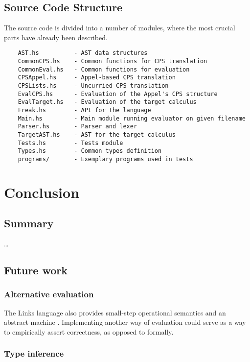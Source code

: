 \documentclass[declaration,shortabstract]{iithesis}
\begin{document}
    \section{Source Code Structure}

    The source code is divided into a number of modules, where the most
    crucial parts have already been described.

    \begin{verbatim}
    AST.hs          - AST data structures
    CommonCPS.hs    - Common functions for CPS translation
    CommonEval.hs   - Common functions for evaluation
    CPSAppel.hs     - Appel-based CPS translation
    CPSLists.hs     - Uncurried CPS translation
    EvalCPS.hs      - Evaluation of the Appel's CPS structure
    EvalTarget.hs   - Evaluation of the target calculus
    Freak.hs        - API for the language
    Main.hs         - Main module running evaluator on given filename
    Parser.hs       - Parser and lexer
    TargetAST.hs    - AST for the target calculus
    Tests.hs        - Tests module
    Types.hs        - Common types definition
    programs/       - Exemplary programs used in tests
    \end{verbatim}

\chapter{Conclusion}
\section{Summary}
    \ldots
\section{Future work}

    \subsection{Alternative evaluation}

    The Links language also provides small-step operational semantics and
    an abstract machine \cite{liberating-effects}. Implementing another way
    of evaluation could serve as a way to empirically assert correctness,
    as opposed to formally.

    \subsection{Type inference}
\end{document}

